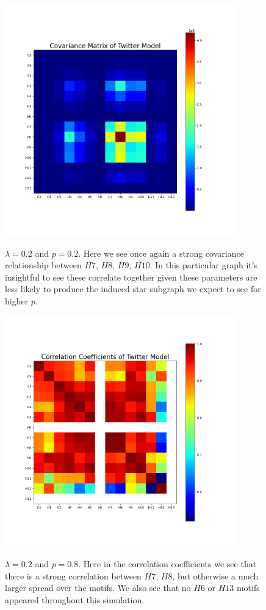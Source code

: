 \begin{figure}
    \includegraphics[width=10cm]{Images/CovMatTwitterModel020209.png}\
    \centering
    \caption{$\lambda=0.2$ and $p=0.2$. Here we see once again 
    a strong covariance relationship between $H7$, $H8$, $H9$, $H10$. In this particular graph 
    it's insightful to see these correlate together given these parameters 
    are less likely to produce the induced star subgraph we expect to see for higher $p$.}
\end{figure}

\begin{figure}
    \includegraphics[width=10cm]{Images/CorrCoefTwitterModel020809.png}\
    \centering
    \caption{$\lambda=0.2$ and $p=0.8$. Here in the correlation coefficients we 
    see that there is a strong correlation between $H7$, $H8$, but otherwise a much
    larger spread over the motifs. We also see that no $H6$ or $H13$ motifs appeared
    throughout this simulation.}
\end{figure}


